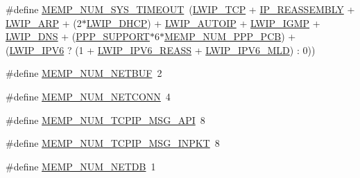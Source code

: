 \begin{DoxyCompactItemize}
\#define \hyperlink{group__lwip__opts__memp_ga4afbdca581a58d57bc7a81118a95327e}{M\+E\+M\+P\+\_\+\+N\+U\+M\+\_\+\+S\+Y\+S\+\_\+\+T\+I\+M\+E\+O\+UT}~(\hyperlink{group__lwip__opts__tcp_gaa4ed98deb97b77c633cb8870f34c71e9}{L\+W\+I\+P\+\_\+\+T\+CP} + \hyperlink{group__lwip__opts__ipv4_ga1a31ab0e0f37b17d40fa7c35bc2c4f69}{I\+P\+\_\+\+R\+E\+A\+S\+S\+E\+M\+B\+LY} + \hyperlink{group__lwip__opts__arp_ga9609a014bba4638cc191d6a8f9556c87}{L\+W\+I\+P\+\_\+\+A\+RP} + (2$\ast$\hyperlink{openmote-cc2538_2lwip_2test_2unit_2lwipopts_8h_a8a6ec62dc121064ac591b1fd8567bee9}{L\+W\+I\+P\+\_\+\+D\+H\+CP}) + \hyperlink{group__lwip__opts__autoip_gaaf1b3a089827223589baf1b7f4f57069}{L\+W\+I\+P\+\_\+\+A\+U\+T\+O\+IP} + \hyperlink{openmote-cc2538_2lwip_2test_2unit_2lwipopts_8h_adaf25915ae1fd69c0943ef68cbb38923}{L\+W\+I\+P\+\_\+\+I\+G\+MP} + \hyperlink{group__lwip__opts__dns_ga98710dd81446b7cb2daac736bae6f646}{L\+W\+I\+P\+\_\+\+D\+NS} + (\hyperlink{openmote-cc2538_2lwip_2src_2include_2netif_2ppp_2ppp__opts_8h_a746c0ebaef5399987d53a1426eba6273}{P\+P\+P\+\_\+\+S\+U\+P\+P\+O\+RT}$\ast$6$\ast$\hyperlink{openmote-cc2538_2lwip_2src_2include_2netif_2ppp_2ppp__opts_8h_a6721ea95cbd6afd6968470c2423b6482}{M\+E\+M\+P\+\_\+\+N\+U\+M\+\_\+\+P\+P\+P\+\_\+\+P\+CB}) + (\hyperlink{openmote-cc2538_2lwip_2test_2fuzz_2lwipopts_8h_a872e3bb3fe2212156d66b18fccc9643f}{L\+W\+I\+P\+\_\+\+I\+P\+V6} ? (1 + \hyperlink{group__lwip__opts__ipv6_gad0ef160d72e63b02c5e875b06ec53864}{L\+W\+I\+P\+\_\+\+I\+P\+V6\+\_\+\+R\+E\+A\+SS} + \hyperlink{group__lwip__opts__mld6_ga44d8f24eaebbc50221ac1336212a3528}{L\+W\+I\+P\+\_\+\+I\+P\+V6\+\_\+\+M\+LD}) \+: 0))
\item 
\#define \hyperlink{group__lwip__opts__memp_ga5d99df65869ac101ed6a611fc85016be}{M\+E\+M\+P\+\_\+\+N\+U\+M\+\_\+\+N\+E\+T\+B\+UF}~2
\item 
\#define \hyperlink{group__lwip__opts__memp_gacb40bd726b7e15593b20a628d298f456}{M\+E\+M\+P\+\_\+\+N\+U\+M\+\_\+\+N\+E\+T\+C\+O\+NN}~4
\item 
\#define \hyperlink{group__lwip__opts__memp_gafbbfd6ce8536038cd00fa85bebae987c}{M\+E\+M\+P\+\_\+\+N\+U\+M\+\_\+\+T\+C\+P\+I\+P\+\_\+\+M\+S\+G\+\_\+\+A\+PI}~8
\item 
\#define \hyperlink{group__lwip__opts__memp_gab089a7088439e726c3801ba9e249d831}{M\+E\+M\+P\+\_\+\+N\+U\+M\+\_\+\+T\+C\+P\+I\+P\+\_\+\+M\+S\+G\+\_\+\+I\+N\+P\+KT}~8
\item 
\#define \hyperlink{group__lwip__opts__memp_ga293bc22b60bf3f8e2520f60a88370e7a}{M\+E\+M\+P\+\_\+\+N\+U\+M\+\_\+\+N\+E\+T\+DB}~1
\item 

\end{DoxyCompactItemize}
